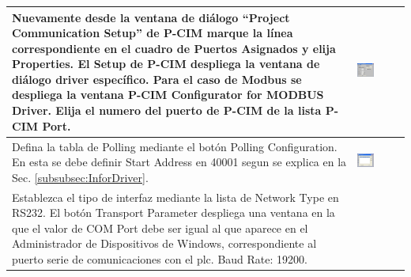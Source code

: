 \begin{table}[H]
\centering
\renewcommand*{\arraystretch}{0.01}
\begin{tabular}{*{2}{m{}}}
\hline
  Nuevamente desde la ventana de diálogo ``Project Communication Setup'' de
  P-CIM marque la línea correspondiente en el cuadro de Puertos Asignados y 
  elija  Properties. El Setup de P-CIM despliega la ventana de diálogo driver 
  específico. Para el caso de Modbus se despliega la ventana P-CIM Configurator 
  for MODBUS Driver. Elija el numero del puerto de P-CIM de la lista P-CIM Port.
  &\begin{center}
    \includegraphics[width=0.4\textwidth]
      {Cap5-SCADA/images/modbusDriver.jpeg}
  \end{center}\\
\hline
  Defina la tabla de Polling mediante el botón Polling Configuration. En esta
  se debe definir Start Address en 40001 segun se explica en la 
  Sec. \ref{subsubsec:InforDriver}.
  &\begin{center}
        \includegraphics[width=0.4\textwidth]
      {Cap5-SCADA/images/modbusDriver1.jpeg}
  \end{center}\\
\hline 
   Establezca el tipo de interfaz mediante la lista de Network Type en RS232. 
   El botón Transport Parameter despliega una ventana en la que el valor de COM 
   Port debe ser igual al que aparece en el Administrador de 
   Dispositivos de Windows, correspondiente al puerto serie de
   comunicaciones con el \gls{plc}. Baud Rate: 19200.

\end{tabular}
\end{table}

